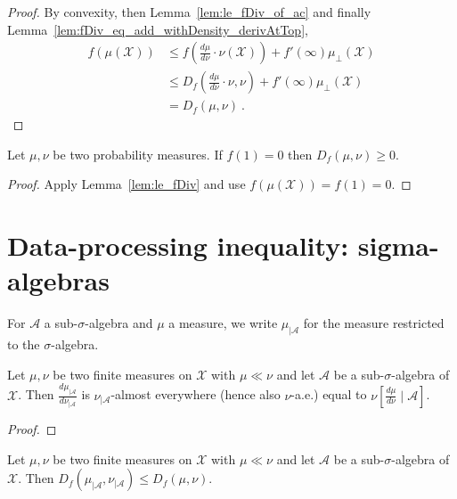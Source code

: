 \begin{proof}\leanok
{}
By convexity, then Lemma~\ref{lem:le_fDiv_of_ac} and finally Lemma~\ref{lem:fDiv_eq_add_withDensity_derivAtTop},
\begin{align*}
f(\mu(\mathcal X))
&\le f(\frac{d\mu}{d\nu}\cdot \nu (\mathcal X)) + f'(\infty)\mu_{\perp}(\mathcal X)
\\
&\le D_f(\frac{d\mu}{d\nu}\cdot \nu , \nu) + f'(\infty)\mu_{\perp}(\mathcal X)
\\
&= D_f(\mu, \nu)
\: .
\end{align*}
\end{proof}

\begin{lemma}
  \label{lem:fDiv_nonneg}
  \leanok
  Let $\mu, \nu$ be two probability measures. If $f(1) = 0$ then $D_f(\mu, \nu) \ge 0$.
\end{lemma}

\begin{proof}\leanok
{}
Apply Lemma~\ref{lem:le_fDiv} and use $f(\mu(\mathcal X)) = f(1) = 0$.
\end{proof}

\section{Data-processing inequality: sigma-algebras}

For $\mathcal A$ a sub-$\sigma$-algebra and $\mu$ a measure, we write $\mathcal \mu_{| \mathcal A}$ for the measure restricted to the $\sigma$-algebra.

\begin{lemma}
  \label{lem:rnDeriv_trim_of_ac}
  \leanok
  Let $\mu, \nu$ be two finite measures on $\mathcal X$ with $\mu \ll \nu$ and let $\mathcal A$ be a sub-$\sigma$-algebra of $\mathcal X$.
  Then $\frac{d \mu_{| \mathcal A}}{d \nu_{| \mathcal A}}$ is $\nu_{| \mathcal A}$-almost everywhere (hence also $\nu$-a.e.) equal to $\nu\left[ \frac{d \mu}{d \nu} \mid \mathcal A\right]$.
\end{lemma}

\begin{proof}\leanok
\end{proof}

\begin{lemma}
  \label{lem:fDiv_trim_le_of_ac}
  \leanok
  Let $\mu, \nu$ be two finite measures on $\mathcal X$ with $\mu \ll \nu$ and let $\mathcal A$ be a sub-$\sigma$-algebra of $\mathcal X$. Then
  $D_f(\mu_{| \mathcal A}, \nu_{| \mathcal A}) \le D_f(\mu, \nu)$.
\end{lemma}

